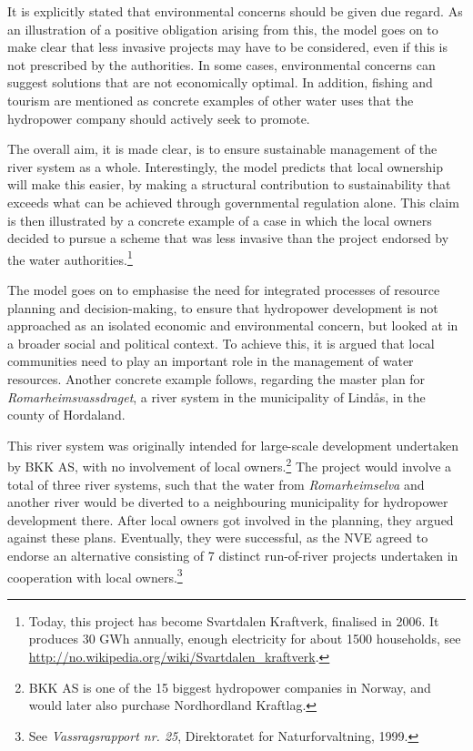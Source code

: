 It is explicitly stated that environmental concerns should be given due regard. As an illustration of a positive obligation arising from this, the model goes on to make clear that less invasive projects may have to be considered, even if this is not prescribed by the authorities. In some cases, environmental concerns can suggest solutions that are not economically optimal. In addition, fishing and tourism are mentioned as concrete examples of other water uses that the hydropower company should actively seek to promote.

The overall aim, it is made clear, is to ensure sustainable management of the river system as a whole. Interestingly, the model predicts that local ownership will make this easier, by making a structural  contribution to sustainability that exceeds what can be achieved through governmental regulation alone. This claim is then illustrated by a concrete example of a case in which the local owners decided to pursue a scheme that was less invasive than the project endorsed by the water authorities.\footnote{Today, this project has become Svartdalen Kraftverk, finalised in 2006. It produces 30 GWh annually, enough electricity for about 1500 households, see \url{http://no.wikipedia.org/wiki/Svartdalen_kraftverk}.}

The model goes on to emphasise the need for integrated processes of resource planning and decision-making, to ensure that hydropower development is not approached as an isolated economic and environmental concern, but looked at in a broader social and political context. To achieve this, it is argued that local communities need to play an important role in the management of water resources. Another concrete example follows, regarding the master plan for {\it Romarheimsvassdraget}, a river system in the municipality of Lindås, in the county of Hordaland.

This river system was originally intended for large-scale development undertaken by BKK AS, with no involvement of local owners.\footnote{BKK AS is one of the 15 biggest hydropower companies in Norway, and would later also purchase Nordhordland Kraftlag.} The project would involve a total of three river systems, such that the water from {\it Romarheimselva} and another river would be diverted to a neighbouring municipality for hydropower development there. After local owners got involved in the planning, they argued against these plans. Eventually, they were successful, as the NVE agreed to endorse an alternative consisting of 7 distinct run-of-river projects undertaken in cooperation with local owners.\footnote{See {\it Vassragsrapport nr. 25}, Direktoratet for Naturforvaltning, 1999.}

